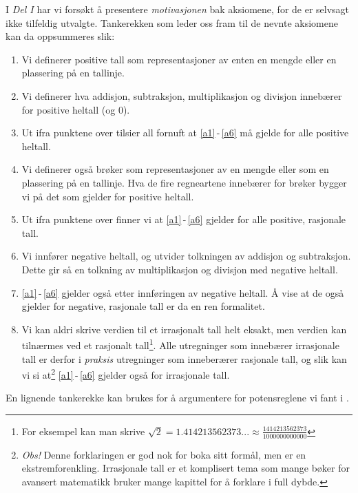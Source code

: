 \newpage
I \textsl{Del I} har vi forsøkt å presentere \textsl{motivasjonen} bak aksiomene, for de er selvsagt ikke tilfeldig utvalgte. Tankerekken som leder oss fram til de nevnte aksiomene kan da oppsummeres slik:
\begin{enumerate}
	\item Vi definerer positive tall som representasjoner av enten en mengde eller en plassering på en tallinje.
	\item Vi definerer hva addisjon, subtraksjon, multiplikasjon og divisjon innebærer for positive heltall (og 0).
	\item Ut ifra punktene over tilsier all fornuft at \eqref{a1}\,-\,\eqref{a6} må gjelde for alle positive heltall.
	\item Vi definerer også brøker som representasjoner av en mengde eller som en plassering på en tallinje. Hva de fire regneartene innebærer for brøker bygger vi på det som gjelder for positive heltall.
	\item Ut ifra punktene over finner vi at \eqref{a1}\,-\,\eqref{a6} gjelder for alle positive, rasjonale tall.
	\item Vi innfører negative heltall, og utvider tolkningen av addisjon og subtraksjon. Dette gir så en tolkning av multiplikasjon og divisjon med negative heltall.
	\item \eqref{a1}\,-\,\eqref{a6} gjelder også etter innføringen av negative heltall. Å vise at de også gjelder for negative, rasjonale tall er da en ren formalitet.
	\item Vi kan aldri skrive verdien til et irrasjonalt tall helt eksakt, men verdien kan tilnærmes ved et rasjonalt tall\footnote{For eksempel kan man skrive $ \sqrt{2}=1.414213562373...\approx\frac{1414213562373}{1000000000000} $}. Alle utregninger som innebærer irrasjonale tall er derfor i \textsl{praksis} utregninger som inneberærer rasjonale tall, og slik kan vi si at\footnote{\textit{Obs!} Denne forklaringen er god nok for boka sitt formål, men er en ekstrem\qquad forenkling. Irrasjonale tall er et komplisert tema som mange bøker for avansert matematikk bruker mange kapittel for å forklare i full dybde.} \eqref{a1}\,-\,\eqref{a6} gjelder også for irrasjonale tall.
\end{enumerate}
En lignende tankerekke kan brukes for å argumentere for potensreglene vi fant i . 


